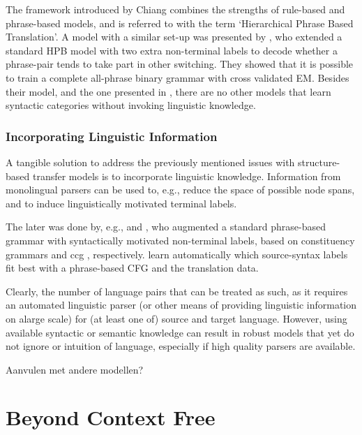 \documentclass{report}
\theoremstyle{definition}
\theoremstyle{plain}
\begin{document}
The framework introduced by Chiang combines the strengths of rule-based and phrase-based models, and is referred to with the term `Hierarchical Phrase Based Translation'. A model with a similar set-up was presented by \cite{mylonakis2010learning}, who extended a standard HPB model with two extra non-terminal labels to decode whether a phrase-pair tends to take part in other switching. They showed that it is possible to train a complete all-phrase binary grammar with cross validated EM. Besides their model, and the one presented in \cite{blunsom2008bayesian}, there are no other models that learn syntactic categories without invoking linguistic knowledge.


\subsubsection{Incorporating Linguistic Information}

A tangible solution to address the previously mentioned issues with structure-based transfer models is to incorporate linguistic knowledge. Information from monolingual parsers can be used to, e.g., reduce the space of possible node spans, and to induce linguistically motivated terminal labels.

The later was done by, e.g., \cite{zollmann2006syntax} and \cite{almaghout2010ccg}, who augmented a standard phrase-based grammar with syntactically motivated non-terminal labels, based on constituency grammars and ccg \citep{steedman2011combinatory}, respectively. \cite{mylonakis2011learning} learn automatically which source-syntax labels fit best with a phrase-based CFG and the translation data.

Clearly, the number of language pairs that can be treated as such, as it requires an automated linguistic parser (or other means of providing linguistic information on alarge scale) for (at least one of) source and target language. However, using available syntactic or semantic knowledge can result in robust models that yet do not ignore or intuition of language, especially if high quality parsers are available.

Aanvulen met andere modellen?



\section{Beyond Context Free}
\label{sec:bcf}
\end{document}

